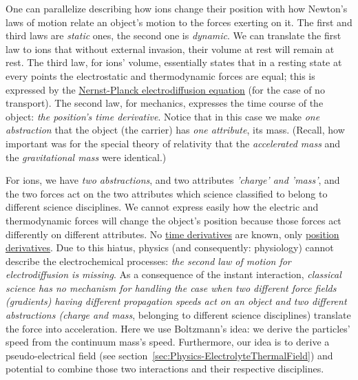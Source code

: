 One can parallelize describing how ions change their position with how Newton's laws of motion relate an object's motion to the forces exerting on it. The first and third laws are \textit{static} ones, the second one is \textit{dynamic}. We can translate the first law to ions that without external invasion, their volume at rest will remain at rest. The third law,
for ions' volume, essentially states that in a resting state at every points the electrostatic and thermodynamic forces are equal; this is expressed by the
\hyperlink{NernstPlanckPositionDerivatives}
{Nernst-Planck electrodiffusion equation} (for the case of no transport).
 The second law, for mechanics, expresses the time course of the object: \textit{the position's time derivative}.
 Notice that in this case we make \textit{one abstraction} that the object (the carrier) has \textit{one attribute}, its mass.
(Recall, how important was for the special theory of relativity that the \textit{accelerated mass} and the \textit{gravitational mass} were identical.) 
 

For ions, we have \textit{two abstractions}, and two attributes \textit{'charge' and 'mass'}, and the two forces act on the two attributes which science classified to belong to different science disciplines. We cannot express easily how the electric and thermodynamic forces will change the object's position because those forces act differently on different attributes.
No \hyperlink{NernstPlanckTimeDerivatives}
{time derivatives} are known,
only \hyperlink{NernstPlanckPositionDerivatives}
{position derivatives}.
Due to this hiatus, physics (and consequently: physiology) cannot describe the electrochemical processes: \textit{the second law of motion for electrodiffusion is missing}.
As a consequence of the instant interaction, \textit{classical science has no mechanism for handling the case
when two different force fields (gradients) having different propagation speeds act on an object
and two different abstractions (charge and mass},
belonging to different science disciplines) translate the force into acceleration. Here we use Boltzmann's idea: we derive the particles' speed
from the continuum mass's speed. Furthermore, our idea is to derive a pseudo-electrical field (see section~\ref{sec:Physics-ElectrolyteThermalField}) and potential to combine those two interactions and their respective disciplines.

